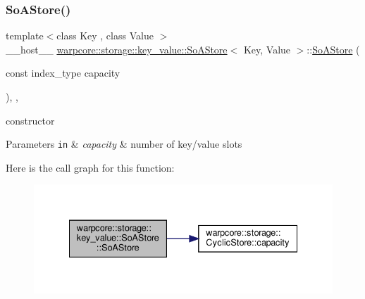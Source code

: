 \subsubsection{\texorpdfstring{So\+A\+Store()}{SoAStore()}\hspace{0.1cm}{\footnotesize\ttfamily [1/3]}}
{\footnotesize\ttfamily template$<$class Key , class Value $>$ \\
\+\_\+\+\_\+host\+\_\+\+\_\+ \hyperlink{classwarpcore_1_1storage_1_1key__value_1_1SoAStore}{warpcore\+::storage\+::key\+\_\+value\+::\+So\+A\+Store}$<$ Key, Value $>$\+::\hyperlink{classwarpcore_1_1storage_1_1key__value_1_1SoAStore}{So\+A\+Store} (\begin{DoxyParamCaption}\item[{const index\+\_\+type}]{capacity }\end{DoxyParamCaption})\hspace{0.3cm}{\ttfamily [inline]}, {\ttfamily [explicit]}, {\ttfamily [noexcept]}}



constructor 


\begin{DoxyParams}[1]{Parameters}
\mbox{\tt in}  & {\em capacity} & number of key/value slots \\
\hline
\end{DoxyParams}
Here is the call graph for this function\+:
\nopagebreak
\begin{figure}[H]
\begin{center}
\leavevmode
\includegraphics[width=335pt]{classwarpcore_1_1storage_1_1key__value_1_1SoAStore_a4dc140aa67de81f7bdff2bc16f6a1b8b_cgraph}
\end{center}
\end{figure}
\mbox{\label{classwarpcore_1_1storage_1_1key__value_1_1SoAStore_afa42ed6e282fadc26ebbc583617978f4}} 
